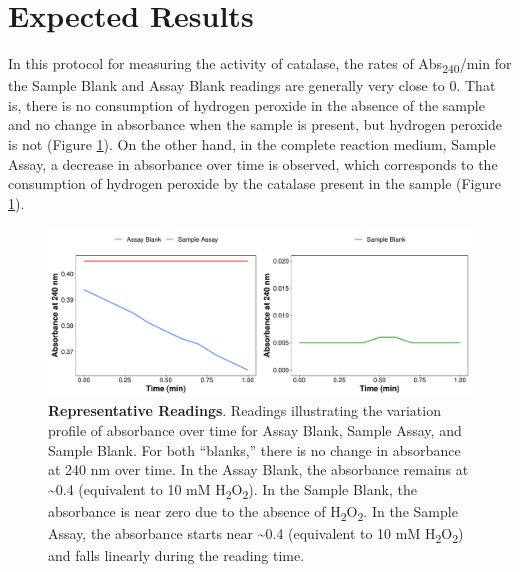 \documentclass[
  9pt,
  american,
  a5paper,
  extrafontsizes,onecolumn,openright
  ]{memoir}
\begin{document}
\section{Expected Results}\label{expected-results}

In this protocol for measuring the activity of catalase, the rates of Abs\textsubscript{240}/min for the Sample Blank and Assay Blank readings are generally very close to 0. That is, there is no consumption of hydrogen peroxide in the absence of the sample and no change in absorbance when the sample is present, but hydrogen peroxide is not (Figure \ref{fig:fig-cat-assay-curves}). On the other hand, in the complete reaction medium, Sample Assay, a decrease in absorbance over time is observed, which corresponds to the consumption of hydrogen peroxide by the catalase present in the sample (Figure \ref{fig:fig-cat-assay-curves}).



\scriptsize

\begin{figure}

{\centering \includegraphics[width=1\linewidth]{Volume-1_files/figure-latex/fig-cat-assay-curves-1} 

}

\caption{\textbf{Representative Readings}. Readings illustrating the variation profile of absorbance over time for Assay Blank, Sample Assay, and Sample Blank. For both \enquote{blanks,} there is no change in absorbance at 240 nm over time. In the Assay Blank, the absorbance remains at \textasciitilde0.4 (equivalent to 10 mM H\textsubscript{2}O\textsubscript{2}). In the Sample Blank, the absorbance is near zero due to the absence of H\textsubscript{2}O\textsubscript{2}. In the Sample Assay, the absorbance starts near \textasciitilde0.4 (equivalent to 10 mM H\textsubscript{2}O\textsubscript{2}) and falls linearly during the reading time.}\label{fig:fig-cat-assay-curves}
\end{figure}
\end{document}

